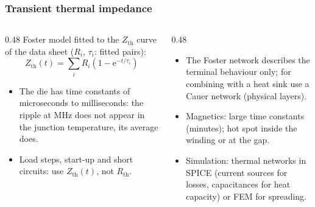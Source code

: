 \begin{frame}
	\frametitle{Transient thermal impedance}
	\begin{columns}[T]
		\begin{column}{0.48\textwidth}
			\small
			Foster model fitted to the $Z_\mathrm{th}$ curve of the data sheet ($R_i$, $\tau_i$: fitted pairs):
			\begin{equation*}
				Z_\mathrm{th}(t)=\sum_iR_i\left(1-\mathrm{e}^{-t/\tau_i}\right)
			\end{equation*}
			\begin{itemize}
				\item The die has time constants of microseconds to milliseconds: the ripple at MHz does not appear in the junction temperature, its average does.
				\item Load steps, start-up and short circuits: use $Z_\mathrm{th}(t)$, not $R_\mathrm{th}$.
			\end{itemize}
		\end{column}
		\begin{column}{0.48\textwidth}
			\small
			\begin{itemize}
				\item The Foster network describes the terminal behaviour only; for combining with a heat sink use a Cauer network (physical layers).
				\item Magnetics: large time constants (minutes); hot spot inside the winding or at the gap.
				\item Simulation: thermal networks in SPICE (current sources for losses, capacitances for heat capacity) or FEM for spreading.
			\end{itemize}
		\end{column}
	\end{columns}
\end{frame}

